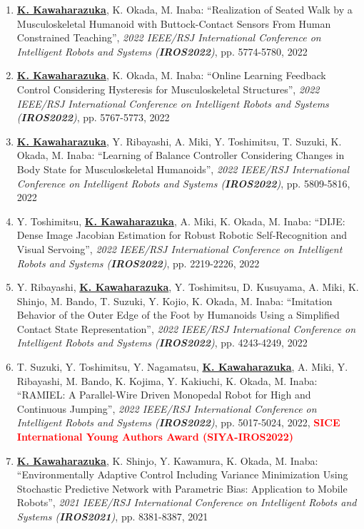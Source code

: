 \documentclass[letterpaper]{article}
\begin{document}
\begin{enumerate}
\item \underline{\textbf{K. Kawaharazuka}}, K. Okada, M. Inaba: ``Realization of Seated Walk by a Musculoskeletal Humanoid with Buttock-Contact Sensors From Human Constrained Teaching'', \textit{2022 IEEE/RSJ International Conference on Intelligent Robots and Systems (\textit{\textbf{IROS2022}})}, pp. 5774-5780, 2022
\item \underline{\textbf{K. Kawaharazuka}}, K. Okada, M. Inaba: ``Online Learning Feedback Control Considering Hysteresis for Musculoskeletal Structures'', \textit{2022 IEEE/RSJ International Conference on Intelligent Robots and Systems (\textit{\textbf{IROS2022}})}, pp. 5767-5773, 2022
\item \underline{\textbf{K. Kawaharazuka}}, Y. Ribayashi, A. Miki, Y. Toshimitsu, T. Suzuki, K. Okada, M. Inaba: ``Learning of Balance Controller Considering Changes in Body State for Musculoskeletal Humanoids'', \textit{2022 IEEE/RSJ International Conference on Intelligent Robots and Systems (\textit{\textbf{IROS2022}})}, pp. 5809-5816, 2022
\item Y. Toshimitsu, \underline{\textbf{K. Kawaharazuka}}, A. Miki, K. Okada, M. Inaba: ``DIJE: Dense Image Jacobian Estimation for Robust Robotic Self-Recognition and Visual Servoing'', \textit{2022 IEEE/RSJ International Conference on Intelligent Robots and Systems (\textit{\textbf{IROS2022}})}, pp. 2219-2226, 2022
\item Y. Ribayashi, \underline{\textbf{K. Kawaharazuka}}, Y. Toshimitsu, D. Kusuyama, A. Miki, K. Shinjo, M. Bando, T. Suzuki, Y. Kojio, K. Okada, M. Inaba: ``Imitation Behavior of the Outer Edge of the Foot by Humanoids Using a Simplified Contact State Representation'', \textit{2022 IEEE/RSJ International Conference on Intelligent Robots and Systems (\textit{\textbf{IROS2022}})}, pp. 4243-4249, 2022
\item T. Suzuki, Y. Toshimitsu, Y. Nagamatsu, \underline{\textbf{K. Kawaharazuka}}, A. Miki, Y. Ribayashi, M. Bando, K. Kojima, Y. Kakiuchi, K. Okada, M. Inaba: ``RAMIEL: A Parallel-Wire Driven Monopedal Robot for High and Continuous Jumping'', \textit{2022 IEEE/RSJ International Conference on Intelligent Robots and Systems (\textit{\textbf{IROS2022}})}, pp. 5017-5024, 2022, \textbf{\textcolor{red}{SICE International Young Authors Award (SIYA-IROS2022)}}
\item \underline{\textbf{K. Kawaharazuka}}, K. Shinjo, Y. Kawamura, K. Okada, M. Inaba: ``Environmentally Adaptive Control Including Variance Minimization Using Stochastic Predictive Network with Parametric Bias: Application to Mobile Robots'', \textit{2021 IEEE/RSJ International Conference on Intelligent Robots and Systems (\textit{\textbf{IROS2021}})}, pp. 8381-8387, 2021

\end{enumerate}
\end{document}
